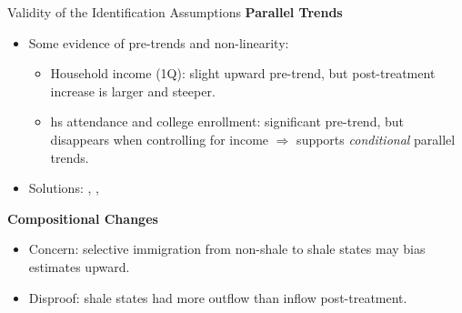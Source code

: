 \documentclass[12pt,  aspectratio=169]{beamer}    %
\begin{document}
\begin{frame}{Validity  of  the  Identification  Assumptions}
\label{sec:validity}
\textbf{Parallel  Trends}
\begin{itemize}
  \item  Some  evidence  of  pre-trends  and  non-linearity:
    \begin{itemize}
      \item  Household  income  (1Q):  slight  upward  pre-trend,  but  post-treatment  increase  is  larger  and  steeper.
      \item  hs  attendance  and  college  enrollment:  significant  pre-trend,  but  disappears  when  controlling  for  income  $\Rightarrow$  supports  \textit{conditional}  parallel  trends.
    \end{itemize}
  \item  Solutions:  \textcite{athey2025triply},  \textcite{athey2021matrix},  \textcite{arkhangelsky2021synthetic}
\end{itemize}

\textbf{Compositional  Changes}
\begin{itemize}
  \item  Concern:  selective  immigration  from  non-shale  to  shale  states  may  bias  estimates  upward.
  \item  Disproof:  shale  states  had  more  outflow  than  inflow  post-treatment.\hyperlink{sec:migration}{}
\end{itemize}
\end{frame}
\end{document}
